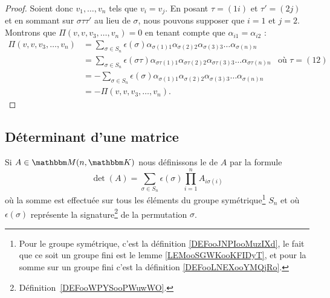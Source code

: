 \begin{proof}
    Soient donc \( v_1,\ldots, v_n\) tels que \( v_i=v_j\). En posant \( \tau=(1i)\) et \( \tau'=(2j)\) et en sommant sur \( \sigma\tau\tau'\) au lieu de \( \sigma\), nous pouvons supposer que \( i=1\) et \( j=2\). Montrons que \( \Pi(v,v,v_3,\ldots, v_n)=0\) en tenant compte que \( \alpha_{i1}=\alpha_{i2}\) :
    \begin{subequations}
        \begin{align}
            \Pi(v,v,v_3,\ldots, v_n)&=\sum_{\sigma\in S_n}\epsilon(\sigma)\alpha_{\sigma(1)1}\alpha_{\sigma(2)2}\alpha_{\sigma(3)3}\ldots \alpha_{\sigma(n)n}\\
            &=\sum_{\sigma\in S_n}\epsilon(\sigma\tau)\alpha_{\sigma\tau(1)1}\alpha_{\sigma\tau(2)2}\alpha_{\sigma\tau(3)3}\ldots \alpha_{\sigma\tau(n)n}&\text{où } \tau=(12)\\
            &=-\sum_{\sigma\in S_n}\epsilon(\sigma)\alpha_{\sigma(1)1}\alpha_{\sigma(2)2}\alpha_{\sigma(3)3}\ldots \alpha_{\sigma(n)n} \\
            &=-\Pi(v,v,v_3,\ldots, v_n).
        \end{align}
    \end{subequations}
\end{proof}

\subsection{Déterminant d'une matrice}

\begin{propositionDef}      \label{DEFooYCKRooTrajdP}
    Si \( A\in\eM(n,\eK)\) nous définissons le  de \( A\) par la formule
    \begin{equation}\label{EQDEF_detPermutations}
        \det(A)=\sum_{\sigma\in S_n}\epsilon(\sigma)\prod_{i=1}^nA_{i\sigma(i)}
    \end{equation}
    où la somme est effectuée sur tous les éléments du groupe symétrique\footnote{Pour le groupe symétrique, c'est la définition \ref{DEFooJNPIooMuzIXd}, le fait que ce soit un groupe fini est le lemme \ref{LEMooSGWKooKFIDyT}, et pour la somme sur un groupe fini c'est la définition \ref{DEFooLNEXooYMQjRo}.} \( S_n\) et où \(\epsilon(\sigma)\) représente la signature\footnote{Définition~\ref{DEFooWPYSooPWuwWO}.} de la permutation \( \sigma\).
\end{propositionDef}

